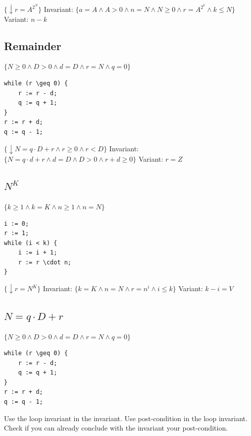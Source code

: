 \documentclass{article}
\begin{document}
$\{\downarrow r = A^{2^N}\}$
Invariant: $\{ a = A \land A > 0 \land n = N \land N \geq 0 \land r = A^{2^k} \land k \leq N \}$
Variant: $n - k$
\subsection{Remainder}
$\{ N \geq 0 \land D > 0 \land d = D \land r = N \land q = 0 \}$

\begin{lstlisting}[style=mystyle, caption=Haskell Code, label=code:haskell]
while (r \geq 0) { 
    r := r - d; 
    q := q + 1;
} 
r := r + d;
q := q - 1;
\end{lstlisting}
$\{\downarrow N = q \cdot D + r \land r \geq 0 \land r < D\}$
Invariant: $\{ N = q \cdot d + r \land d = D \land D > 0 \land r + d \geq 0 \}$
Variant: $r = Z$
\subsection{$N^K$}
$\{ k \geq 1 \land k = K \land n \geq 1 \land n = N \}$

\begin{lstlisting}[style=mystyle, caption=Haskell Code, label=code:haskell]
i := 0;
r := 1;
while (i < k) {
    i := i + 1;
    r := r \cdot n;
}
\end{lstlisting}

$\{\downarrow r = N^K\}$
Invariant: $\{ k = K \land n = N \land r = n^i \land i \leq k \}$
Variant: $k - i = V$
\subsection{$N = q \cdot D + r$}

$\{ N \geq 0 \land D > 0 \land d = D \land r = N \land q = 0 \}$
\begin{lstlisting}[style=mystyle, caption=Haskell Code, label=code:haskell]
while (r \geq 0) {
    r := r - d;
    q := q + 1;
}
r := r + d;
q := q - 1;
\end{lstlisting}
Use the loop invariant in the invariant.
Use post-condition in the loop invariant.
Check if you can already conclude with the invariant your post-condition.
\end{document}
